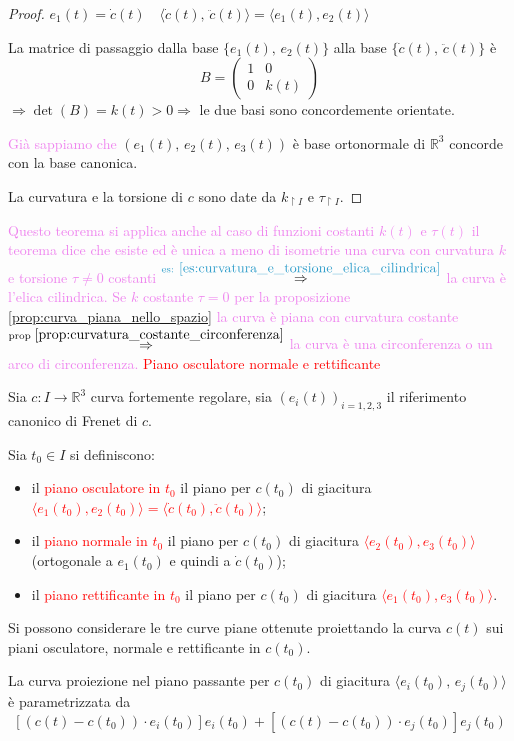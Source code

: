 \begin{proof}
        $e_1(t)=\dot{c}(t) \quad \langle \dot{c}(t), \, \ddot{c}(t) \rangle = \langle e_1(t), e_2(t) \rangle$

        La matrice di passaggio dalla base $\{ e_1(t), \, e_2(t) \}$ alla base $\{ \dot{c}(t), \, \ddot{c}(t) \}$ è 
        \[ B = \begin{pmatrix} 1 & 0 \\ 0 & k(t) \end{pmatrix} \]
        $\Rightarrow \det (B)=k(t) >0 \Rightarrow$ le due basi sono concordemente orientate.

        \textcolor{violet}{Già sappiamo che } $\left(e_1(t), \, e_2(t), \, e_3(t)\right)$ è base ortonormale di $\mathbb{R}^3$ concorde con la base canonica.

        La curvatura e la torsione di $c$ sono date da $k_{\restriction{I}}$ e $\tau_{\restriction{I}}$.
        \end{proof}
        \textcolor{violet}{Questo teorema si applica anche al caso di funzioni costanti $k(t)$ e $\tau(t)$ il teorema dice che esiste ed 
        è unica a meno di isometrie una curva con curvatura $k$ e torsione $\tau \neq 0$ costanti $\overset{\textcolor{celeste}{\text{es: }\ref{es:curvatura_e_torsione_elica_cilindrica}}}{\Rightarrow}$ la curva è l'elica cilindrica.}
        \textcolor{violet}{Se $k$ costante $\tau = 0$ per la proposizione \ref{prop:curva_piana_nello_spazio} la curva è piana con 
        curvatura costante $\overset{\textcolor{black}{\text{prop } \ref{prop:curvatura_costante_circonferenza}}}{\Rightarrow}$ la curva è una circonferenza o un arco di circonferenza.}
        \newpage
        \textcolor{red}{Piano osculatore normale e rettificante}
        \begin{definizione}
        Sia $c \colon I \to \mathbb{R}^3$ curva fortemente regolare, sia $\left(e_i(t)\right)_{i=1,2,3}$ il riferimento canonico di Frenet di $c$.

        Sia $t_0 \in I$ si definiscono:
        \begin{itemize}
        \item il \textcolor{red}{piano osculatore in $t_0$} il piano per $c(t_0)$ di giacitura \textcolor{red}{$\langle e_1(t_0), e_2(t_0) \rangle = \langle \dot{c}(t_0), \ddot{c}(t_0) \rangle$};
        \item il \textcolor{red}{piano normale in $t_0$} il piano per $c(t_0)$ di giacitura \textcolor{red}{$\langle e_2(t_0), e_3(t_0) \rangle$} \textcolor{blu}{(ortogonale a
        $e_1(t_0)$ e quindi a $\dot{c}(t_0)$)};
        \item il \textcolor{red}{piano rettificante in $t_0$} il piano per $c(t_0)$ di giacitura \textcolor{red}{$\langle e_1(t_0), e_3(t_0) \rangle$}.
        \end{itemize}
        Si possono considerare le tre curve piane ottenute proiettando la curva $c(t)$ sui piani osculatore, normale e rettificante in $c(t_0)$.

        La curva proiezione nel piano passante per $c(t_0)$ di giacitura $\langle e_i(t_0), \, e_j(t_0) \rangle$ è parametrizzata da
        \[ \left[ \left(c(t) - c(t_0)\right) \cdot e_i(t_0)  \right] e_i(t_0) + \left[ \left(c(t) - c(t_0)\right) \cdot e_j(t_0)  \right] e_j(t_0) \]
        \end{definizione}
